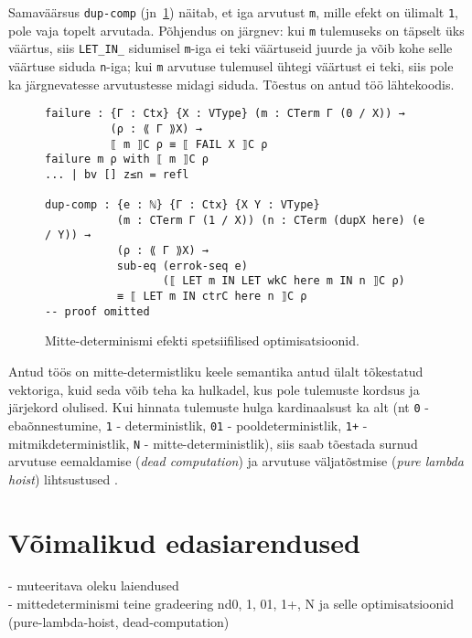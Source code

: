 \documentclass[a4paper,12pt]{article}
\begin{document}
Samaväärsus {\tt dup-comp} (jn~\ref{fig:nd.opt2}) näitab, et iga arvutust {\tt m}, mille efekt on ülimalt {\tt 1}, pole vaja topelt arvutada. Põhjendus on järgnev: kui {\tt m} tulemuseks on täpselt üks väärtus, siis {\tt LET_IN_} sidumisel {\tt m}-iga ei teki väärtuseid juurde ja võib kohe selle väärtuse siduda {\tt n}-iga; kui {\tt m} arvutuse tulemusel ühtegi väärtust ei teki, siis pole ka järgnevatesse arvutustesse midagi siduda. Tõestus on antud töö lähtekoodis.
\begin{figure}
  \begin{BVerbatim}
failure : {Γ : Ctx} {X : VType} (m : CTerm Γ (0 / X)) →
          (ρ : ⟪ Γ ⟫X) → 
          ⟦ m ⟧C ρ ≡ ⟦ FAIL X ⟧C ρ
failure m ρ with ⟦ m ⟧C ρ
... | bv [] z≤n = refl

dup-comp : {e : ℕ} {Γ : Ctx} {X Y : VType} 
           (m : CTerm Γ (1 / X)) (n : CTerm (dupX here) (e / Y)) →
           (ρ : ⟪ Γ ⟫X) → 
           sub-eq (errok-seq e)
                  (⟦ LET m IN LET wkC here m IN n ⟧C ρ)
           ≡ ⟦ LET m IN ctrC here n ⟧C ρ
-- proof omitted
  \end{BVerbatim}
  \caption{Mitte-determinismi efekti spetsiifilised optimisatsioonid.}
  \label{fig:nd.opt2}
\end{figure}

Antud töös on mitte-determistliku keele semantika antud ülalt tõkestatud vektoriga,
kuid seda võib teha ka hulkadel, kus pole tulemuste kordsus ja järjekord olulised.
Kui hinnata tulemuste hulga kardinaalsust ka alt (nt {\tt 0} - ebaõnnestumine, {\tt 1} - deterministlik, {\tt 01} - pooldeterministlik, {\tt 1+} - mitmikdeterministlik, {\tt N} - mitte-deterministlik), siis saab tõestada surnud arvutuse eemaldamise (\emph{dead computation}) ja arvutuse väljatõstmise (\emph{pure lambda hoist}) lihtsustused \cite{Benton2016}.

\iffalse
\clearpage\vspace*{0pt}
\section{Võimalikud edasiarendused}

- muteeritava oleku laiendused\\
- mittedeterminismi teine gradeering nd0, 1, 01, 1+, N ja selle optimisatsioonid (pure-lambda-hoist, dead-computation)

\begin{figure}
  \begin{BVerbatim}
  \end{BVerbatim}
  \caption{}
  \label{fig:nd.something}
\end{figure}
\end{document}
